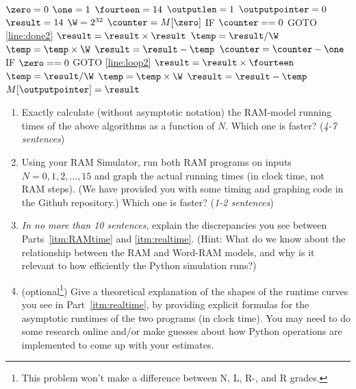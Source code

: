\documentclass[11pt]{article}
\begin{document}
\begin{enumerate}
\begin{algorithm}[H]
\setcounter{AlgoLine}{-1}
$\zero = 0$\;
$\one = 1$\;
$\fourteen = 14$\;
$\outputlen = 1$\;
$\outputpointer = 0$\;
$\result = 14$\;
$\W = 2^{32}$\;
$\counter = M[\zero]$\;
\Indp
IF $\counter == 0$ GOTO \ref{line:done2}\; \label{line:loop2}
$\result = \result \times \result$\;
$\temp = \result / \W$\;
$\temp = \temp \times \W$\;
$\result = \result - \temp$\;
$\counter = \counter - \one$\;
IF $\zero == 0$ GOTO \ref{line:loop2}\;
\Indm
$\result = \result \times \fourteen$\;
\label{line:done2}
$\temp = \result / \W$\;
$\temp = \temp \times \W$\;
$\result = \result - \temp$\;
$M[\outputpointer]=\result$\; 
\end{algorithm}

\begin{enumerate}
    \item Exactly calculate (without asymptotic notation) the RAM-model running times of the above algorithms as a function of $N$.
    Which one is faster? (\textit{4-7 sentences}) \label{itm:RAMtime} 
    
    \item Using your RAM Simulator, run both RAM programs on inputs $N=0,1,2,\ldots,15$ and graph the actual running times (in clock time, not RAM steps).  (We have provided you with some timing and graphing code in the Github repository.) Which one is faster?  \label{itm:realtime} (\textit{1-2 sentences})

    \item \textit{In no more than 10 sentences}, explain the discrepancies you see between Parts~\ref{itm:RAMtime} and \ref{itm:realtime}.  (Hint: What do we know about the relationship between the RAM and Word-RAM models, and why is it relevant to how efficiently the Python simulation runs?) 

    \item (optional\footnote{This problem won't make a difference between N, L, R-, and R grades.}) Give a theoretical explanation of the shapes of the runtime curves you see in Part~\ref{itm:realtime}, by providing explicit formulas for the asymptotic runtimes of the two programs (in clock time). You may need to do some research online and/or make guesses about how Python operations are implemented to come up with your estimates. 

\end{enumerate}


\end{enumerate}
\end{document}
